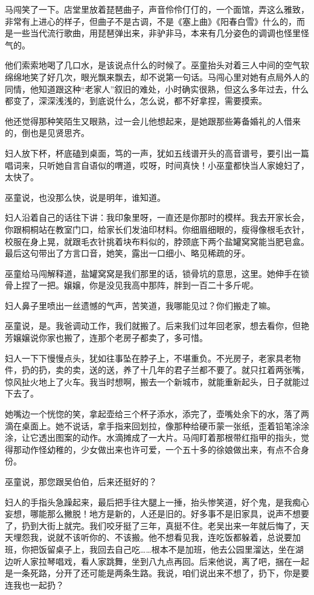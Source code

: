 \documentclass[lang=cn,newtx,12pt,scheme=chinese]{elegantbook}
\begin{document}
马闯笑了一下。店堂里放着琵琶曲子，声音伶伶仃仃的，一个面馆，弄这么雅致，非常有上进心的样子，但曲子不是古调，不是《塞上曲》《阳春白雪》什么的，而是一些当代流行歌曲，用琵琶弹出来，非驴非马，本来有几分姿色的调调也怪里怪气的。

他们索索地喝了几口水，是该说点什么的时候了。巫童抬头对着三人中间的空气软绵绵地笑了好几次，眼光飘来飘去，却不说第一句话。马闯心里对她有点局外人的同情，他知道跟这种“老家人”叙旧的难处，小时确实很熟，但这么多年过去，什么都变了，深深浅浅的，到底说什么，怎么说，都不好拿捏，需要摸索。

他还觉得那种笑陌生又眼熟，过一会儿他想起来，是她跟那些筹备婚礼的人借来的，倒也是见贤思齐。

妇人放下杯，杯底磕到桌面，笃的一声，犹如五线谱开头的高音谱号，要引出一篇唱词来，只听她自言自语似的喟道，哎呀，时间真快！小巫童都快当人家媳妇了，太快了。

巫童说，也没那么快，说是明年，谁知道。

妇人沿着自己的话往下讲：我印象里呀，一直还是你那时的模样。我去开家长会，你跟桐桐站在教室门口，给家长们发油印材料。你细眉细眼的，瘦得像根毛衣针，校服在身上晃，就跟毛衣针挑着块布料似的，脖颈底下两个盐罐窝窝能当肥皂盒。最后这句带出了方言口音，她笑，露出一口细小、略见稀疏的牙。

巫童给马闯解释道，盐罐窝窝是我们那里的话，锁骨坑的意思，这里。她伸手在锁骨上捏了一把。嬢嬢，你是没见我高中那阵，胖到一百二十多斤呢。

妇人鼻子里喷出一丝遗憾的气声，苦笑道，我哪能见过？你们搬走了嘛。

巫童说，是。我爸调动工作，我们就搬了。后来我们过年回老家，想去看你，但艳芳嬢嬢说你家也搬了，连那个老房子都卖了，多可惜。

妇人一下下慢慢点头，犹如往事坠在脖子上，不堪重负。不光房子，老家具老物件，扔的扔，卖的卖，送的送，养了十几年的君子兰都不要了。就只扛着两张嘴，惊风扯火地上了火车。我当时想啊，搬去一个新城市，就能重新起头，日子就能过下去了。

她嘴边一个恍惚的笑，拿起壶给三个杯子添水，添完了，壶嘴处余下的水，落了两滴在桌面上。她不说话，拿手指来回划拉，像那种给硬币蒙一张纸，歪着铅笔涂涂涂，让它透出图案的动作。水滴摊成了一大片。马闯盯着那根带红指甲的指头，觉得那动作怪幼稚的，少女做出来也许可爱，一个五十多的徐娘做出来，有点不合身份。

巫童说，那您跟吴伯伯，后来还挺好的？

妇人的手指头急躁起来，最后把手往大腿上一捶，抬头惨笑道，好个鬼，是我痴心妄想，哪能那么撇脱！地方是新的，人还是旧的。好多事不是旧家具，说声不想要了，扔到大街上就完。我们咬牙挺了三年，真挺不住。老吴出来一年就后悔了，天天埋怨我，说就不该听你的、不该搬。他不想看见我，连吃饭都躲着，总说要加班，你把饭留桌子上，我回去自己吃……根本不是加班，他去公园里溜达，坐在湖边听人家拉琴唱戏，看人家跳舞，坐到八九点再回。后来他说，离了吧，捆在一起是一条死路，分开了还可能是两条生路。我说，咱们说出来不想了，扔下，你是要连我也一起扔？
\end{document}
